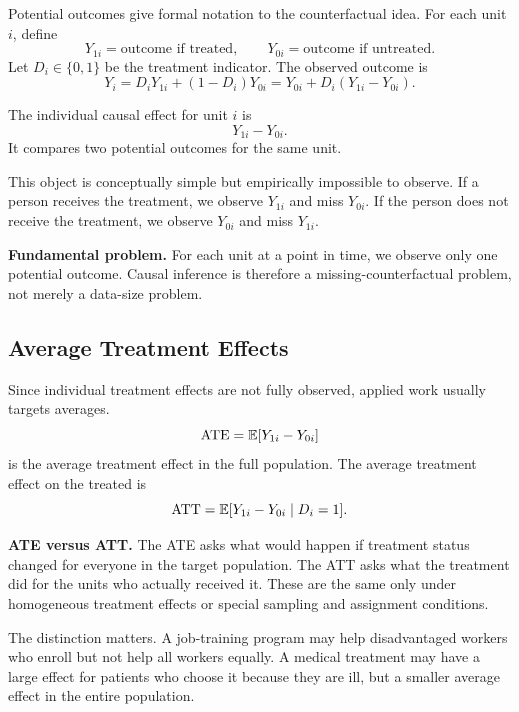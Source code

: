 Potential outcomes give formal notation to the counterfactual idea. For each
unit \(i\), define
\[
    Y_{1i} = \text{outcome if treated}, \qquad
    Y_{0i} = \text{outcome if untreated}.
\]
Let \(D_i\in\{0,1\}\) be the treatment indicator. The observed outcome is
\[
    Y_i = D_iY_{1i} + (1-D_i)Y_{0i}
        = Y_{0i} + D_i(Y_{1i}-Y_{0i}).
\]

\begin{defN}
The individual causal effect for unit \(i\) is
\[
    Y_{1i}-Y_{0i}.
\]
It compares two potential outcomes for the same unit.
\end{defN}

This object is conceptually simple but empirically impossible to observe. If a
person receives the treatment, we observe \(Y_{1i}\) and miss \(Y_{0i}\). If the
person does not receive the treatment, we observe \(Y_{0i}\) and miss \(Y_{1i}\).

\begin{boxF}
\textbf{Fundamental problem.} For each unit at a point in time, we observe only
one potential outcome. Causal inference is therefore a missing-counterfactual
problem, not merely a data-size problem.
\end{boxF}

\subsection{Average Treatment Effects}

Since individual treatment effects are not fully observed, applied work usually
targets averages.
\[
    \mathrm{ATE} = \mathbb{E}[Y_{1i}-Y_{0i}]
\]
is the average treatment effect in the full population. The average treatment
effect on the treated is
\[
    \mathrm{ATT} = \mathbb{E}[Y_{1i}-Y_{0i}\mid D_i=1].
\]

\begin{boxD}
\textbf{ATE versus ATT.} The ATE asks what would happen if treatment status
changed for everyone in the target population. The ATT asks what the treatment
did for the units who actually received it. These are the same only under
homogeneous treatment effects or special sampling and assignment conditions.
\end{boxD}

The distinction matters. A job-training program may help disadvantaged workers
who enroll but not help all workers equally. A medical treatment may have a
large effect for patients who choose it because they are ill, but a smaller
average effect in the entire population.

